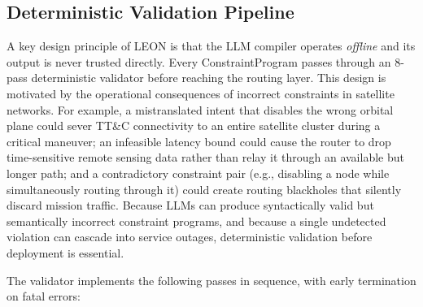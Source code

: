 
\subsection{Deterministic Validation Pipeline}
\label{sec:validator}

A key design principle of LEON is that the LLM compiler operates
\textit{offline} and its output is never trusted directly. Every
ConstraintProgram passes through an 8-pass deterministic validator before
reaching the routing layer. This design is motivated by the operational
consequences of incorrect constraints in satellite networks. For example,
a mistranslated intent that disables the wrong orbital plane could sever
TT\&C connectivity to an entire satellite cluster during a critical
maneuver; an infeasible latency bound could cause the router to drop
time-sensitive remote sensing data rather than relay it through an
available but longer path; and a contradictory constraint pair (e.g.,
disabling a node while simultaneously routing through it) could create
routing blackholes that silently discard mission traffic. Because LLMs
can produce syntactically valid but semantically incorrect constraint
programs, and because a single undetected violation can cascade into
service outages, deterministic validation before deployment is essential.

The validator implements the following passes in sequence, with early
termination on fatal errors:

